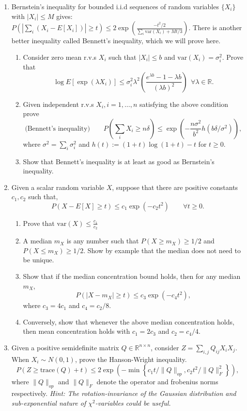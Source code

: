\documentclass[11pt]{article}
\newcommand{\var}{\text{var}}
\begin{document}
\begin{enumerate}
\item Bernstein's inequality for bounded i.i.d sequences of random variables $\{X_i\}$ with $|X_i|\leq M$ gives:
$P(|\sum_i (X_i-E[X_i])|\geq t)\leq 2\exp\left(\frac{-t^2/2}{\sum_i \var(X_i)+Mt/3}\right) $. There is another better inequality called Bennett's inequality, which we will prove here. 
\begin{enumerate}
\item Consider zero mean r.v.s $X_i$ such that $|X_i|\leq b$ and $\var(X_i)=\sigma_i^2$. Prove that
$$\log E[\exp(\lambda X_i)]\leq \sigma_i^2\lambda^2\left(\frac{e^{\lambda b}-1-\lambda b}{(\lambda b)^2}\right) \ \ \forall \lambda\in \mathbb{R}.$$
\item Given independent r.v.s $X_i,i=1,\dots,n$ satisfying the above condition prove
$$\mbox{(Bennett's inequality)}\qquad P\left(\sum_i X_i\geq n\delta\right)\leq \exp\left(-\frac{n\sigma^2}{b^2}h(b\delta/\sigma^2)\right),$$
where $\sigma^2=\sum_i\sigma_i^2$ and $h(t):=(1+t)\log (1+t)-t$ for $t\ge 0$.
\item Show that Bennett's inequality is at least as good as Bernstein's inequality.
\end{enumerate}
\item Given a scalar random variable $X$, suppose that there are positive constants $c_1,c_2$ such that, 
$$P(X-E[X]\geq t)\leq c_1\exp(-c_2 t^2)\qquad \forall t\ge 0. $$
\begin{enumerate}
	\item Prove that $\var(X)\leq \frac{c_1}{c_2}$
	\item A median $m_X$ is any number such that $P(X\geq m_X)\geq 1/2$ and $P(X\leq m_X)\geq 1/2$. Show by example that the median does not need to be unique.
	\item Show that if the median concentration bound holds, then for any median $m_X$,
	$$P(|X-m_X|\geq t)\leq c_3\exp(-c_4 t^2),$$
where $c_3=4c_1$ and $c_4=c_2/8$.
	\item Conversely, show that whenever the above median concentration holds, then mean concentration holds with $c_1=2c_3$ and $c_2=c_4/4$.
\end{enumerate}
\item Given a positive semidefinite matrix $Q\in \mathbb{R}^{n\times n}$, consider $Z=\sum_{i,j}Q_{ij}X_iX_j$. When $X_i\sim N(0,1)$, prove the Hanson-Wright inequality.
$$P\left(Z\ge \text{trace}(Q)+ t\right)\leq 2\exp\left(-\min\left\{c_1 t/\|Q\|_{op},c_2 t^2/\|Q\|_F^2\right\}\right),$$
where $\|Q\|_{op}$ and $\|Q\|_{F}$ denote the operator and frobenius norms respectively. \textit{Hint: The rotation-invariance of the
 Gaussian distribution and sub-exponential nature of $\chi^2$-variables could be useful.}
\end{enumerate}
\end{document}
